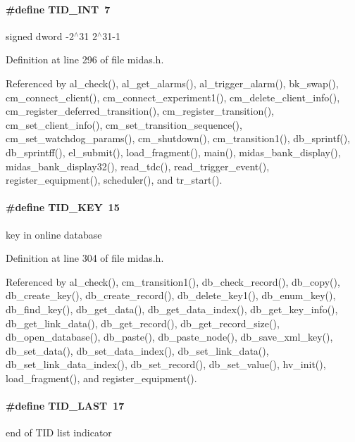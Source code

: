 \paragraph[{TID\_\-INT}]{\setlength{\rightskip}{0pt plus 5cm}\#define TID\_\-INT~7}\hfill\label{group__mdefineh_gad950d5fde6dd3ea7eba59fb6760a38cb}
signed dword -\/2$^\wedge$31 2$^\wedge$31-\/1 

Definition at line 296 of file midas.h.

Referenced by al\_\-check(), al\_\-get\_\-alarms(), al\_\-trigger\_\-alarm(), bk\_\-swap(), cm\_\-connect\_\-client(), cm\_\-connect\_\-experiment1(), cm\_\-delete\_\-client\_\-info(), cm\_\-register\_\-deferred\_\-transition(), cm\_\-register\_\-transition(), cm\_\-set\_\-client\_\-info(), cm\_\-set\_\-transition\_\-sequence(), cm\_\-set\_\-watchdog\_\-params(), cm\_\-shutdown(), cm\_\-transition1(), db\_\-sprintf(), db\_\-sprintff(), el\_\-submit(), load\_\-fragment(), main(), midas\_\-bank\_\-display(), midas\_\-bank\_\-display32(), read\_\-tdc(), read\_\-trigger\_\-event(), register\_\-equipment(), scheduler(), and tr\_\-start().
\paragraph[{TID\_\-KEY}]{\setlength{\rightskip}{0pt plus 5cm}\#define TID\_\-KEY~15}\hfill\label{group__mdefineh_ga15ae151ae0b7588b3327bd8451d9bcb8}
key in online database 

Definition at line 304 of file midas.h.

Referenced by al\_\-check(), cm\_\-transition1(), db\_\-check\_\-record(), db\_\-copy(), db\_\-create\_\-key(), db\_\-create\_\-record(), db\_\-delete\_\-key1(), db\_\-enum\_\-key(), db\_\-find\_\-key(), db\_\-get\_\-data(), db\_\-get\_\-data\_\-index(), db\_\-get\_\-key\_\-info(), db\_\-get\_\-link\_\-data(), db\_\-get\_\-record(), db\_\-get\_\-record\_\-size(), db\_\-open\_\-database(), db\_\-paste(), db\_\-paste\_\-node(), db\_\-save\_\-xml\_\-key(), db\_\-set\_\-data(), db\_\-set\_\-data\_\-index(), db\_\-set\_\-link\_\-data(), db\_\-set\_\-link\_\-data\_\-index(), db\_\-set\_\-record(), db\_\-set\_\-value(), hv\_\-init(), load\_\-fragment(), and register\_\-equipment().
\paragraph[{TID\_\-LAST}]{\setlength{\rightskip}{0pt plus 5cm}\#define TID\_\-LAST~17}\hfill\label{group__mdefineh_gaedf8b3d53db358c7f8b92514815ab3d7}
end of TID list indicator 

